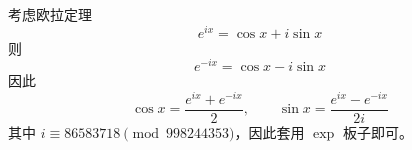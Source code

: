 考虑欧拉定理
\[
e^{ix} = \cos{x} + i\sin{x}
\]
则
\[
e^{-ix} = \cos{x} - i\sin{x}
\]
因此
\[
\cos{x} = \frac{e^{ix} + e^{-ix}}{2},\qquad
\sin{x} = \frac{e^{ix} - e^{-ix}}{2i}
\]
其中 $i \equiv 86583718 \pmod{998244353}$，因此套用 $\exp$ 板子即可。